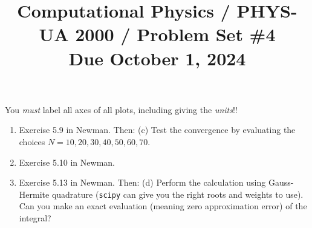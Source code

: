 \documentclass[11pt, preprint]{aastex}
\begin{document}
\title{\bf Computational Physics / PHYS-UA 2000 / Problem Set \#4
\\ Due October 1, 2024 }

You {\it must} label all axes of all plots, including giving the {\it
  units}!!

\begin{enumerate}
  \item Exercise 5.9 in Newman. Then: (c) Test the convergence by
    evaluating the choices $N=10, 20, 30, 40, 50, 60, 70$.
  \item Exercise 5.10 in Newman.
  \item Exercise 5.13 in Newman. Then: (d) Perform the calculation
    using Gauss-Hermite quadrature ({\tt scipy} can give you the right
    roots and weights to use). Can you make an exact evaluation
    (meaning zero approximation error) of the integral?
\end{enumerate}
\end{document}

